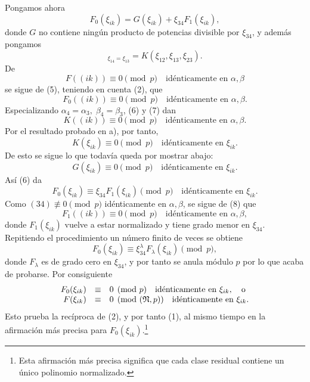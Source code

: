 \documentclass[11pt]{article}
\begin{document}
Pongamos ahora
\begin{equation}
        F_0(\xi_{ik})=G(\xi_{ik})+\xi_{34}F_1(\xi_{ik}),
\end{equation}
donde \(G\) no contiene ningún producto de potencias divisible por \(\xi_{34}\), y además pongamos
\begin{equation}
        [G]_{\xi_{14}=\xi_{13}}=K(\xi_{12},\xi_{13},\xi_{23}).
\end{equation}
De
\[
        F((ik))\equiv0\pmod p\quad \text{idénticamente en \(\alpha,\beta\)}
\]
se sigue de (5), teniendo en cuenta (2), que
\begin{equation}
        F_0((ik))\equiv0\pmod p\quad \text{idénticamente en \(\alpha,\beta\)}.
\end{equation}
Especializando \(\alpha_4=\alpha_3,\;\beta_4=\beta_3\), (6) y (7) dan
\[
        K((ik))\equiv0\pmod p\quad \text{idénticamente en \(\alpha,\beta\)}.
\]
Por el resultado probado en a), por tanto,
\[
        K(\xi_{ik})\equiv0\pmod p\quad \text{idénticamente en \(\xi_{ik}\)}.
\]
De esto se sigue lo que todavía queda por mostrar abajo:
\[
        G(\xi_{ik})\equiv0\pmod p\quad \text{idénticamente en \(\xi_{ik}\)}.
\]
Así (6) da
\[
        F_0(\xi_{ik})\equiv \xi_{34}F_1(\xi_{ik})\pmod p
        \quad \text{idénticamente en \(\xi_{ik}\)}.
\]
Como \((34)\not\equiv0\pmod p\) idénticamente en \(\alpha,\beta\), se sigue de (8) que
\[
        F_1((ik))\equiv0\pmod p\quad \text{idénticamente en \(\alpha,\beta\)},
\]
donde \(F_1(\xi_{ik})\) vuelve a estar normalizado y tiene grado menor en \(\xi_{34}\). Repitiendo el procedimiento un número finito de veces se obtiene
\[
        F_0(\xi_{ik})\equiv\xi_{34}^{\lambda}F_\lambda(\xi_{ik})\pmod p,
\]
donde \(F_\lambda\) es de grado cero en \(\xi_{34}\), y por tanto se anula módulo \(p\) por lo que acaba de probarse. Por consiguiente
\begin{equation}
\begin{array}{rcl}
        F_0(\xi_{ik})&\equiv&0\pmod p\quad \text{idénticamente en \(\xi_{ik}\)},\quad\text{o}\\
        F(\xi_{ik})&\equiv&0\pmod{(\mathfrak N,p)}\quad \text{idénticamente en \(\xi_{ik}\)}.
\end{array}
\end{equation}
Esto prueba la recíproca de (2), y por tanto (1), al mismo tiempo en la afirmación más precisa para \(F_0(\xi_{ik})\).\footnote{Esta afirmación más precisa significa que cada clase residual contiene un único polinomio normalizado.}
\end{document}
